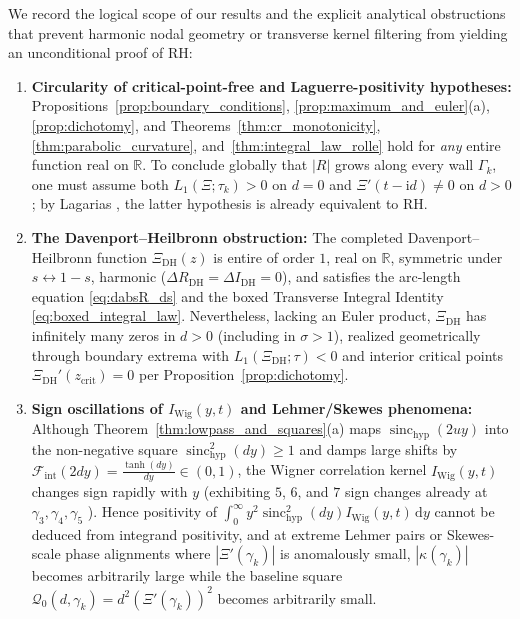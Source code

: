 \documentclass[11pt,a4paper,reqno]{amsart}
\theoremstyle{definition}
\theoremstyle{remark}
\numberwithin{equation}{section}
\newcommand{\dd}{\mathrm{d}}
\newcommand{\ii}{\mathrm{i}}
\newcommand{\sinch}{\operatorname{sinc}_{\mathrm{hyp}}}
\newcommand{\Fint}{\mathcal{F}_{\mathrm{int}}}
\begin{document}
We record the logical scope of our results and the explicit analytical obstructions that prevent harmonic nodal geometry or transverse kernel filtering from yielding an unconditional proof of RH:
\begin{enumerate}
\item \textbf{Circularity of critical-point-free and Laguerre-positivity hypotheses:}
Propositions~\ref{prop:boundary_conditions}, \ref{prop:maximum_and_euler}(a), \ref{prop:dichotomy}, and Theorems~\ref{thm:cr_monotonicity}, \ref{thm:parabolic_curvature}, and~\ref{thm:integral_law_rolle} hold for \emph{any} entire function real on $\mathbb{R}$. To conclude globally that $|R|$ grows along every wall $\Gamma_k$, one must assume both $L_1(\Xi;\tau_k) > 0$ on $d = 0$ and $\Xi'(t-\ii d) \neq 0$ on $d > 0$; by Lagarias \cite{Lagarias1999}, the latter hypothesis is already equivalent to RH.
\item \textbf{The Davenport--Heilbronn obstruction:}
The completed Davenport--Heilbronn function $\Xi_{\mathrm{DH}}(z)$ \cite{DavenportHeilbronn1936,Titchmarsh1986} is entire of order $1$, real on $\mathbb{R}$, symmetric under $s \leftrightarrow 1-s$, harmonic ($\Delta R_{\mathrm{DH}} = \Delta I_{\mathrm{DH}} = 0$), and satisfies the arc-length equation \eqref{eq:dabsR_ds} and the boxed Transverse Integral Identity \eqref{eq:boxed_integral_law}. Nevertheless, lacking an Euler product, $\Xi_{\mathrm{DH}}$ has infinitely many zeros in $d > 0$ (including in $\sigma > 1$), realized geometrically through boundary extrema with $L_1(\Xi_{\mathrm{DH}}; \tau) < 0$ and interior critical points $\Xi_{\mathrm{DH}}'(z_{\mathrm{crit}}) = 0$ per Proposition~\ref{prop:dichotomy}.
\item \textbf{Sign oscillations of $I_{\mathrm{Wig}}(y,t)$ and Lehmer/Skewes phenomena:}
Although Theorem~\ref{thm:lowpass_and_squares}(a) maps $\sinch(2u y)$ into the non-negative square $\sinch^2(d y) \ge 1$ and damps large shifts by $\Fint(2d y) = \frac{\tanh(d y)}{d y} \in (0,1)$, the Wigner correlation kernel $I_{\mathrm{Wig}}(y,t)$ changes sign rapidly with $y$ (exhibiting $5$, $6$, and $7$ sign changes already at $\gamma_3, \gamma_4, \gamma_5$ \cite{Missiaen2026Paper1}). Hence positivity of $\int_0^\infty y^2\sinch^2(d y)I_{\mathrm{Wig}}(y,t)\,\dd y$ cannot be deduced from integrand positivity, and at extreme Lehmer pairs or Skewes-scale phase alignments where $|\Xi'(\gamma_k)|$ is anomalously small, $|\kappa(\gamma_k)|$ becomes arbitrarily large while the baseline square $\mathcal{Q}_0(d,\gamma_k) = d^2(\Xi'(\gamma_k))^2$ becomes arbitrarily small.

\end{enumerate}
\end{document}
